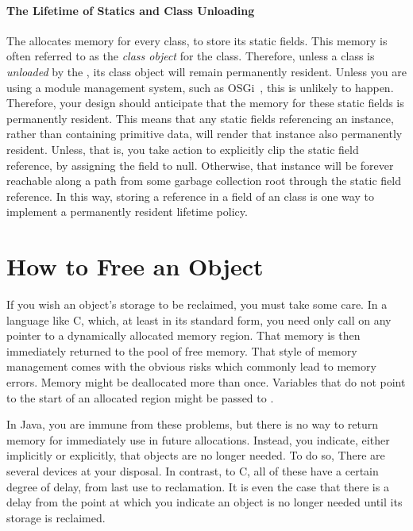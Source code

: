 \paragraph{The Lifetime of Statics and Class Unloading}

The \jre allocates memory for every class, to store its static fields. This
memory is often referred to as the \emph{class object} for the class. Therefore, unless a class is \emph{unloaded} by the \jre, its class
object will remain permanently resident. Unless you are using a module management
system, such as OSGi~\cite{OSGi_2007}, this is unlikely to happen. Therefore,
your design should anticipate that the memory for these static fields is
permanently resident. This means that any static fields referencing an instance,
rather than containing primitive data, will render that instance also permanently
resident. Unless, that is, you take action to explicitly clip the static field
reference, by assigning the field to null. Otherwise, that instance will be
forever reachable along a path from some garbage collection root through the
static field reference. In this way, storing a reference in a  field
of an class is one way to implement a permanently resident lifetime policy.



\section{How to Free an Object}

If you wish an object's storage to be reclaimed, you must take some care. In a
language like C, which, at least in its standard form, you need only call
 on any pointer to a dynamically allocated memory region. That
memory is then immediately returned to the pool of free memory. That style of
memory management comes with the obvious risks which commonly lead to memory
errors. Memory might be deallocated more than once. Variables that do not point
to the start of an allocated region might be passed to .

In Java, you are immune from these problems, but there is no way to return memory
for immediately use in future allocations. Instead, you indicate, either
implicitly or explicitly, that objects are no longer needed. To do so, There are
several devices at your disposal. In contrast, to C, all of these have a certain
degree of delay, from last use to reclamation. It is even the case that
there is a delay from the point at which you indicate an object is no longer
needed until its storage is reclaimed. 


